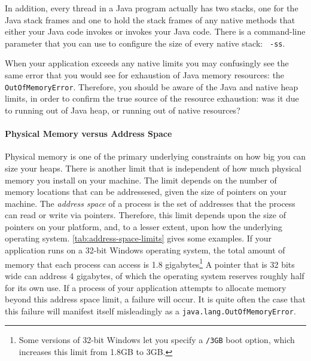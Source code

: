 In addition, every thread in a Java program actually has two stacks, one for the
Java stack frames and one to hold the stack frames of any native methods that
either your Java code invokes or invokes your Java code. There is a command-line
parameter that you can use to configure the size of every native stack: {\tt
-ss}.

When your application exceeds any native limits you may confusingly see the same
error that you would see for exhaustion of Java memory resources: the {\tt
OutOf\-Memory\-Error}. Therefore, you should be aware of the Java and native
heap limits, in order to confirm the true source of the resource exhaustion: was it
due to running out of Java heap, or running out of native resources?





\paragraph{Physical Memory versus Address Space}
Physical memory is one of the primary underlying constraints on how big you can
size your heaps. There is another limit that is independent of how much physical
memory you install on your machine. The limit depends on the number of memory
locations that can be addressesed, given the size of pointers on your machine.
The \emph{address space} of a process is the set of addresses that the process
can read or write via pointers. Therefore, this limit depends upon the size of
pointers on your platform, and, to a lesser extent, upon how the underlying
operating system. \autoref{tab:address-space-limits} gives some examples. If
your application runs on a 32-bit Windows operating system, the total amount of
memory that each process can access is 1.8 gigabytes\footnote{Some versions of
32-bit Windows let you specify a {\tt /3GB} boot option, which increases this
limit from 1.8GB to 3GB.} A pointer that is 32 bits wide can address 4
gigabytes, of which the operating system reserves roughly half for its own use.
If a process of your application attempts to allocate memory beyond this address
space limit, a failure will occur. It is quite often the case that this failure
will manifest itself misleadingly as a {\tt java.lang.OutOfMemoryError}.

